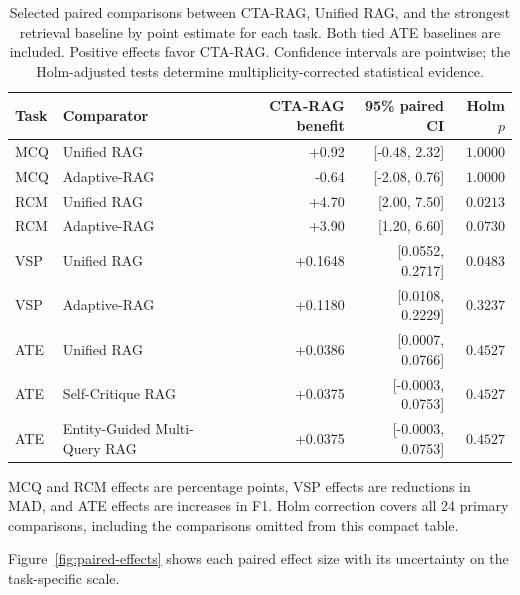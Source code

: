 \documentclass[5p,times,authoryear]{elsarticle}
\begin{document}
\begin{table}[t]
\centering
\small
\caption{Selected paired comparisons between CTA-RAG, Unified RAG, and
the strongest retrieval baseline by point estimate for each task. Both
tied ATE baselines are included. Positive effects favor CTA-RAG. Confidence
intervals are pointwise; the Holm-adjusted tests determine
multiplicity-corrected statistical evidence.}
\label{tab:paired-focus}
\setlength{\tabcolsep}{5pt}
\begin{tabular}{@{}llrrr@{}}
\toprule
Task & Comparator & CTA-RAG benefit & 95\% paired CI & Holm $p$ \\
\midrule
MCQ & Unified RAG                    & +0.92   & [-0.48, 2.32]   & $1.0000$ \\
MCQ & Adaptive-RAG           & -0.64   & [-2.08, 0.76]   & $1.0000$ \\
RCM & Unified RAG                    & +4.70   & [2.00, 7.50]    & $0.0213$ \\
RCM & Adaptive-RAG           & +3.90   & [1.20, 6.60]    & $0.0730$ \\
VSP & Unified RAG                    & +0.1648 & [0.0552, 0.2717]& $0.0483$ \\
VSP & Adaptive-RAG           & +0.1180 & [0.0108, 0.2229]& $0.3237$ \\
ATE & Unified RAG                    & +0.0386 & [0.0007, 0.0766]& $0.4527$ \\
ATE & Self-Critique RAG              & +0.0375 & [-0.0003, 0.0753]& $0.4527$ \\
ATE & Entity-Guided Multi-Query RAG  & +0.0375 & [-0.0003, 0.0753]& $0.4527$ \\
\bottomrule
\end{tabular}
\par\smallskip
\footnotesize
MCQ and RCM effects are percentage points, VSP effects are reductions in
MAD, and ATE effects are increases in F1. Holm correction covers all
24 primary comparisons, including the comparisons omitted from this compact table.
\end{table}
Figure~\ref{fig:paired-effects} shows each paired effect size with its uncertainty on the task-specific scale.
\end{document}

